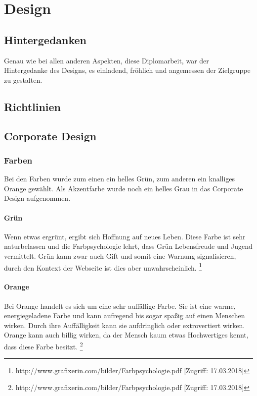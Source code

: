 \chapter{Design}
\renewcommand{\kapitelautor}{Autor: Niklas Kienreich}

\section{Hintergedanken}
\renewcommand{\kapitelautor}{Autor: Niklas Kienreich}
Genau wie bei allen anderen Aspekten, diese Diplomarbeit, war der Hintergedanke des Designs, es einladend, fröhlich und angemessen der Zielgruppe zu gestalten.

\section{Richtlinien}
\section{Corporate Design}
\subsection{Farben}
\renewcommand{\kapitelautor}{Autor: Niklas Kienreich}
Bei den Farben wurde zum einen ein helles Grün, zum anderen ein knalliges Orange gewählt. Als Akzentfarbe wurde noch ein helles Grau in das Corporate Design aufgenommen.

\subsubsection{Grün}
\renewcommand{\kapitelautor}{Autor: Niklas Kienreich}
Wenn etwas ergrünt, ergibt sich Hoffnung auf neues Leben. Diese Farbe ist sehr naturbelassen und die Farbpsychologie lehrt, dass Grün Lebensfreude und Jugend vermittelt. Grün kann zwar auch Gift und somit eine Warnung signalisieren, durch den Kontext der Webseite ist dies aber unwahrscheinlich. \footnote{\label{foot:1} http://www.grafixerin.com/bilder/Farbpsychologie.pdf [Zugriff: 17.03.2018]}

\subsubsection{Orange}
\renewcommand{\kapitelautor}{Autor: Niklas Kienreich}
Bei Orange handelt es sich um eine sehr auffällige Farbe. Sie ist eine warme, energiegeladene Farbe und kann aufregend bis sogar spaßig auf einen Menschen wirken. Durch ihre Auffälligkeit kann sie aufdringlich oder extrovertiert wirken. Orange kann auch billig wirken, da der Mensch kaum etwas Hochwertiges kennt, dass diese Farbe besitzt. \footnote{\label{foot:1} http://www.grafixerin.com/bilder/Farbpsychologie.pdf [Zugriff: 17.03.2018]}

